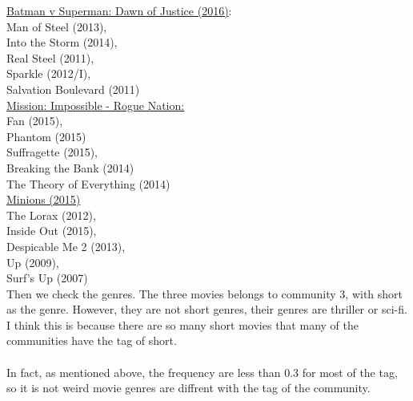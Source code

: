 \documentclass{article}
\begin{document}
\underline{ Batman v Superman: Dawn of Justice (2016)}:\\
Man of Steel (2013), \\
Into the Storm (2014),\\
Real Steel (2011), \\
Sparkle (2012/I),\\
Salvation Boulevard (2011)\\

\underline {Mission: Impossible - Rogue Nation:}\\
Fan (2015),\\
Phantom (2015)\\
Suffragette (2015), \\Breaking the Bank (2014)\\
The Theory of Everything (2014)\\

\underline{Minions (2015)}\\
The Lorax (2012),\\ Inside Out (2015),\\
Despicable Me 2 (2013), \\Up (2009),\\
Surf’s Up (2007)\\

\noindent Then we check the genres. The three movies belongs to community 3, with short as the genre.
However, they are not short genres, their genres are thriller or sci-fi.
I think this is because there are so many short movies that many of the communities have the tag of short. \\
\\
In fact, as mentioned above, the frequency are less than 0.3 for most of the tag, so it is not weird movie genres are diffrent with the tag of the community.
\end{document}
